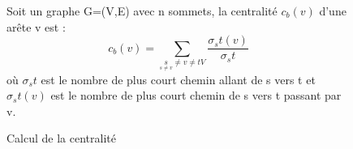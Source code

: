 \begin{figure}[!ht]
   \centering
   \frame
   {
      \parbox{12cm}
      {
         Soit un graphe G=(V,E) avec n sommets, la centralité $c_b(v)$ d'une arête v est :
         \begin{equation}
               c_b(v) = \sum_{\underset{s \neq v}s \neq v \neq t V} \frac{\sigma_st(v)}{\sigma_st}
         \end{equation}
	o\`u $\sigma_st$ est le nombre de plus court chemin allant de s vers t et $\sigma_st(v)$ est le nombre de plus court chemin de s vers t passant par v.
      }
   }
  \caption{\label{centralit\'e}Calcul de la centralit\'e}
\end{figure}



%
